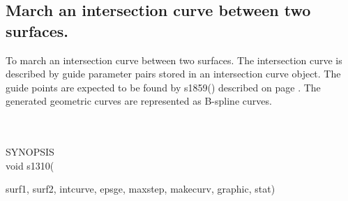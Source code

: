 \subsection{March an intersection curve between two surfaces.}
\begin{minipg1}
  To march an intersection curve between two surfaces.
  The intersection curve is described by guide parameter pairs stored in
  an intersection curve object.
  The guide points are expected to be found by s1859() described on
  page \pageref{s1859}.
  The generated geometric curves are represented as B-spline curves.
\end{minipg1} \\ \\
SYNOPSIS\\
        \>void s1310(\begin{minipg3}
                        {\fov surf1}, {\fov surf2}, {\fov intcurve}, {\fov epsge}, {\fov maxstep}, {\fov makecurv}, {\fov graphic}, {\fov stat})
                \end{minipg3}\\[0.3ex]


